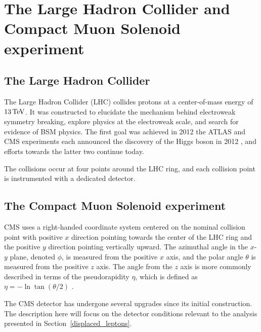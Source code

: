 \chapter{The Large Hadron Collider and Compact Muon Solenoid experiment}
\label{lhc_and_cms}

\section{The Large Hadron Collider}
The Large Hadron Collider (LHC) collides protons at a center-of-mass energy of $13\,\text{Te\hspace{-.08em}V}$. It was constructed to elucidate the mechanism behind electroweak symmetry breaking, explore physics at the electroweak scale, and search for evidence of BSM physics. The first goal was achieved in 2012 the ATLAS and CMS experiments each announced the discovery of the Higgs boson in 2012 \cite{cms_higgs, atlas_higgs}, and efforts towards the latter two continue today.

The collisions occur at four points around the LHC ring, and each collision point is instrumented with a dedicated detector.


\section{The Compact Muon Solenoid experiment}


CMS uses a right-handed coordinate system centered on the nominal collision point with positive $x$ direction pointing towards the center of the LHC ring and the positive $y$ direction pointing vertically upward. The azimuthal angle in the $x$-$y$ plane, denoted $\phi$, is measured from the positive $x$ axis, and the polar angle $\theta$ is measured from the positive $z$ axis. The angle from the $z$ axis is more commonly described in terms of the pseudorapidity $\eta$, which is defined as $\eta=-\ln\tan(\theta/2)$ \cite{cms_tdr_v1}.

The CMS detector has undergone several upgrades since its initial construction. The description here will focus on the detector conditions relevant to the analysis presented in Section~\ref{displaced_leptons}.

